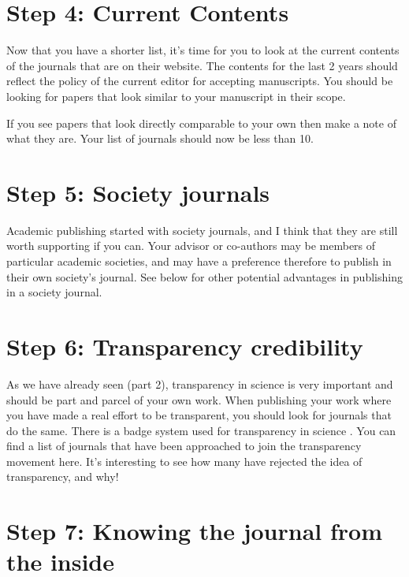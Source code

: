 \documentclass[
]{krantz}
\begin{document}
\hypertarget{step-4-current-contents}{%
\section{Step 4: Current Contents}\label{step-4-current-contents}}

Now that you have a shorter list, it's time for you to look at the current contents of the journals that are on their website. The contents for the last 2 years should reflect the policy of the current editor for accepting manuscripts. You should be looking for papers that look similar to your manuscript in their scope.

If you see papers that look directly comparable to your own then make a note of what they are. Your list of journals should now be less than 10.

\hypertarget{step-5-society-journals}{%
\section{Step 5: Society journals}\label{step-5-society-journals}}

Academic publishing started with society journals, and I think that they are still worth supporting if you can. Your advisor or co-authors may be members of particular academic societies, and may have a preference therefore to publish in their own society's journal. See below for other potential advantages in publishing in a society journal.

\hypertarget{step-6-transparency-credibility}{%
\section{Step 6: Transparency credibility}\label{step-6-transparency-credibility}}

As we have already seen (part 2), transparency in science is very important and should be part and parcel of your own work. When publishing your work where you have made a real effort to be transparent, you should look for journals that do the same. There is a badge system used for transparency in science \citep[see or][or see \citet{marshall2021make} for an example of how this can be applied]{kidwell2016badges}. You can find a list of journals that have been approached to join the transparency movement here. It's interesting to see how many have rejected the idea of transparency, and why!

\hypertarget{step-7-knowing-the-journal-from-the-inside}{%
\section{Step 7: Knowing the journal from the inside}\label{step-7-knowing-the-journal-from-the-inside}}
\end{document}

